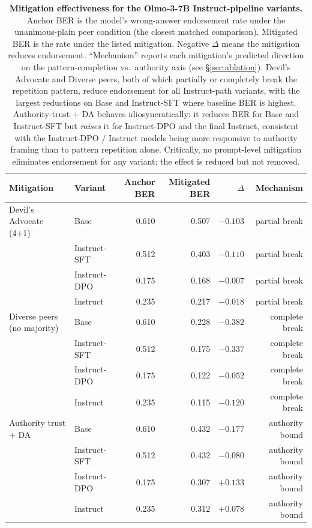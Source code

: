 \documentclass{article}
\begin{document}
\begin{table}[H]
    \centering
    \footnotesize
    \setlength{\tabcolsep}{4pt}
    \renewcommand{\arraystretch}{1.0}
    \begin{tabular}{l l r r r r}
        \toprule
        Mitigation & Variant & Anchor BER & Mitigated BER & $\Delta$ & Mechanism \\
        \midrule
        Devil's Advocate (4+1) & Base & 0.610 & 0.507 & $-0.103$ & partial break \\
         & Instruct-SFT & 0.512 & 0.403 & $-0.110$ & partial break \\
         & Instruct-DPO & 0.175 & 0.168 & $-0.007$ & partial break \\
         & Instruct & 0.235 & 0.217 & $-0.018$ & partial break \\
        \midrule
        Diverse peers (no majority) & Base & 0.610 & 0.228 & $-0.382$ & complete break \\
         & Instruct-SFT & 0.512 & 0.175 & $-0.337$ & complete break \\
         & Instruct-DPO & 0.175 & 0.122 & $-0.052$ & complete break \\
         & Instruct & 0.235 & 0.115 & $-0.120$ & complete break \\
        \midrule
        Authority trust + DA & Base & 0.610 & 0.432 & $-0.177$ & authority bound \\
         & Instruct-SFT & 0.512 & 0.432 & $-0.080$ & authority bound \\
         & Instruct-DPO & 0.175 & 0.307 & $+0.133$ & authority bound \\
         & Instruct & 0.235 & 0.312 & $+0.078$ & authority bound \\
        \bottomrule
    \end{tabular}
    \caption{\textbf{Mitigation effectiveness for the Olmo-3-7B Instruct-pipeline variants.} Anchor BER is the model's wrong-answer endorsement rate under the unanimous-plain peer condition (the closest matched comparison). Mitigated BER is the rate under the listed mitigation. Negative $\Delta$ means the mitigation reduces endorsement. ``Mechanism'' reports each mitigation's predicted direction on the pattern-completion vs.\ authority axis (see \S\ref{sec:ablation}). Devil's Advocate and Diverse peers, both of which partially or completely break the repetition pattern, reduce endorsement for all Instruct-path variants, with the largest reductions on Base and Instruct-SFT where baseline BER is highest. Authority-trust + DA behaves idiosyncratically: it reduces BER for Base and Instruct-SFT but \emph{raises} it for Instruct-DPO and the final Instruct, consistent with the Instruct-DPO / Instruct models being more responsive to authority framing than to pattern repetition alone. Critically, no prompt-level mitigation eliminates endorsement for any variant; the effect is reduced but not removed.}
    \label{tab:mitigation_effectiveness}
\end{table}
\end{document}
